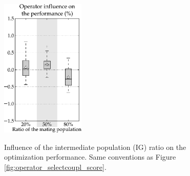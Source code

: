 \documentclass{ametsoc}
\begin{document}
\begin{figure}[t]
	\begin{center}
		\noindent\includegraphics[width=4cm,angle=0]{figures/option_popratio_score.pdf}\\
	\end{center}
	\caption{Influence of the intermediate population (IG) ratio on the optimization performance. Same conventions as Figure \ref{fig:operator_selectcoupl_score}.}
	\label{fig:option_popratio_score}
\end{figure}
\end{document}
